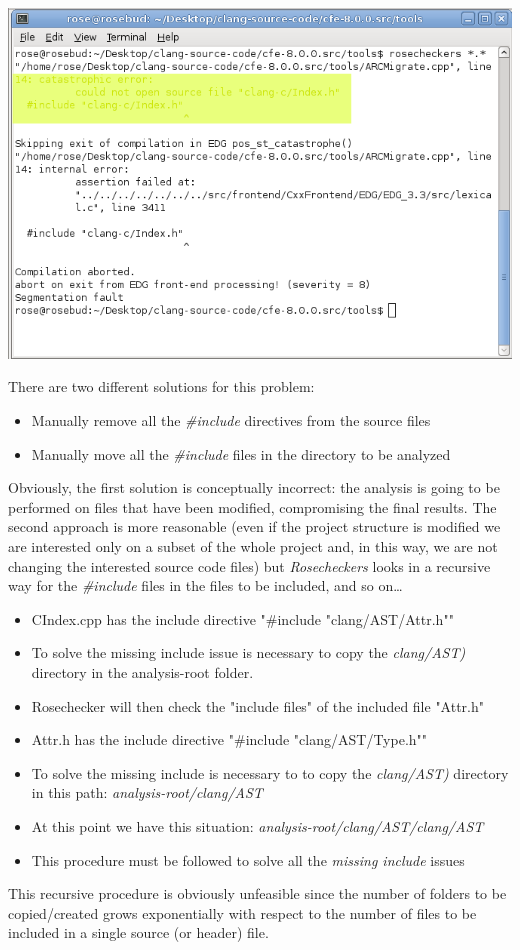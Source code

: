 \begin{minipage}{\linewidth}
	\includegraphics[width=\textwidth]{img/rosechecker-error.png}
\end{minipage}
\pagebreak

There are two different solutions for this problem:
\begin{itemize}
	\item Manually remove all the \textsl{\#include} directives from the source files
	\item Manually move all the \textsl{\#include} files in the directory to be analyzed
\end{itemize}

Obviously, the first solution is conceptually incorrect: the analysis is going to be performed on files that have been modified, compromising the final results.\newline
The second approach is more reasonable (even if the project structure is modified we are interested only on a subset of the whole project and, in this way, we are not changing the interested source code files) but \textsl{Rosecheckers} looks in a recursive way for the \textsl{\#include} files in the files to be included, and so on\dots\newline\newline
[e.g.]
\begin{itemize}
	\item CIndex.cpp has the include directive "\#include "clang/AST/Attr.h""
	\item To solve the missing include issue is necessary to copy the \textsl{clang/AST)} directory in the analysis-root folder.
	\item Rosechecker will then check the "include files" of the included file "Attr.h"
	\item Attr.h has the include directive "\#include "clang/AST/Type.h""
	\item To solve the missing include is necessary to to copy the \textsl{clang/AST)} directory in this path: \textsl{analysis-root/clang/AST}
	\item At this point we have this situation: \textsl{analysis-root/clang/AST/clang/AST}
	\item This procedure must be followed to solve all the \textsl{missing include} issues
\end{itemize}

This recursive procedure is obviously unfeasible since the number of folders to be copied/created grows exponentially with respect to the number of files to be included in a single source (or header) file.